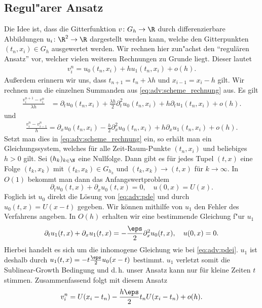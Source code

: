\subsection{Regul"arer Ansatz}

Die Idee ist, dass die Gitterfunktion $v\colon G_h \to \R$ durch differenzierbare Abbildungen $u_i\colon \R^2 \to \R$ dargestellt werden kann, welche den Gitterpunkten $(t_n, x_i) \in G_h$ ausgewertet werden.
Wir rechnen hier zun"achst den ``regulären Ansatz'' vor, welcher vielen weiteren Rechnungen zu Grunde liegt. Dieser lautet
\begin{align}\label{eq:adv:regular:ansatz}
v^n_i = u_0(t_n, x_i) + h u_1(t_n, x_i) + o(h).
\end{align}
Außerdem erinnern wir uns, dass $t_{n+1} = t_n + \lambda h$ und $x_{i-1} = x_i - h$ gilt.
Wir rechnen nun die einzelnen Summanden aus \eqref{eq:adv:scheme_rechnung} aus.
Es gilt
\begin{align}\label{eq:adv:regular:sum1}
\frac {v^{n+1}_i - v^n_i}{\lambda h}
&= \partial_t u_0(t_n, x_i) + \frac {\lambda h}{2} \partial^2_t u_0(t_n, x_i) + h \partial_t u_1(t_n, x_i) + o(h). 
\end{align}
und
\begin{align}\label{eq:adv:regular:sum2}
\frac {v^n_i - v^n_{i-1}}{h} = \partial_x u_0(t_n, x_i) - \frac{h}{2} \partial^2_x u_0(t_n, x_i) + h \partial_x u_1(t_n, x_i) + o(h).
\end{align}
Setzt man dies in \eqref{eq:adv:scheme_rechnung} ein, so erhält man ein Gleichungssystem, welches für alle Zeit-Raum-Punkte $(t_n, x_i)$ und beliebiges $h > 0$ gilt.
Sei $(h_k)_{k \in \N}$ eine Nullfolge.
Dann gibt es für jedes Tupel $(t, x)$ eine Folge $(t_k, x_k)$ mit $(t_k, x_k) \in G_{h_k}$ und  $(t_k, x_k) \to (t,x)$ für $k \to \infty$.
In $O(1)$ bekommt man dann das Anfangswertproblem
\[ \partial_t u_0(t,x) + \partial_x u_0(t, x) = 0, \quad u(0, x) = U(x). \]
Foglich ist $u_0$ direkt die Lösung von \eqref{eq:adv:pde} und durch $u_0(t,x) = U(x-t)$ gegeben.
Wir können mithilfe von $u_1$ den Fehler des Verfahrens angeben.
In $O(h)$ erhalten wir eine bestimmende Gleichung f"ur $u_1$
\[ \partial_t u_1(t,x) + \partial_x u_1(t, x) = -\frac{\eps}{2} \partial^2_x u_0(t, x), \quad u(0, x) = 0. \]
Hierbei handelt es sich um die inhomogene Gleichung wie bei \eqref{eq:adv:pdei}.
$u_1$ ist deshalb durch $u_1(t,x) = - t \frac{\eps}{2} u_0(x - t)$  bestimmt.
$u_1$ verletzt somit die Sublinear-Growth Bedingung und d.\,h. unser Ansatz kann nur für kleine Zeiten $t$ stimmen.
Zusammenfassend folgt mit diesem Ansatz
\[ v^n_i = U(x_i - t_n) - \frac{h \eps}{2} t_n U(x_i - t_n) + o(h). \]